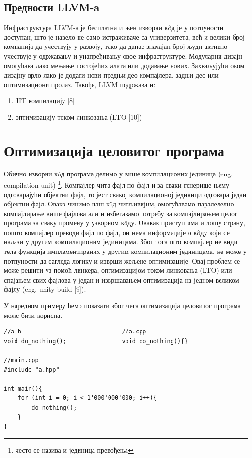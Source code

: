 \documentclass[12pt,oneside]{memoir}
\begin{document}
\section{Предности LLVM-a}

Инфраструктура LLVM-а је бесплатна и њен изворни к\^{o}д је у потпуности доступан, 
што је навело не само истраживаче са универзитета, већ и велики број компанија 
да учествују у развоју, тако да данас значајан број људи активно 
учествује у одржавању и унапређивању овое инфраструктуре.
Модуларни дизајн омогућава лако мењање постојећих алата или додавање нових.
Захваљујући овом дизајну врло лако је додати нови предњи део компајлера, задњи део или
оптимизациони пролаз.
Такође, LLVM подржава и:
\begin{enumerate}
\item JIT компилацију [8]
\item оптимизацију током линковања (LTO [10])
\end{enumerate}

\chapter{Оптимизација целовитог програма}

Обично изворни к\^{o}д програма делимо у више компилационих јединица (eng. compilation unit) \footnote{често се назива и јединица превођења}.
Компајлер чита фајл по фајл и за сваки генерише њему одговарајући објектни фајл,
то јест свакој компилационој јединици одговара један објектни фајл.
Овако чинимо наш к\^{o}д читљивијим, омогућавамо паралелелно компајлирање више 
фајлова али и избегавамо потребу за компајлирањем целог програма за сваку промену
у узворном к\^{o}ду.
Овакав приступ има и лошу страну, пошто компајлер преводи фајл по фајл, он нема 
информације о к\^{o}ду који се налази у другим компилационим јединицама.
Због тога што компајлер не види тела функција имплементираних у другим компилационим
јединицама, не може у потпуности да сагледа логику и изврши жељене оптимизације.
Овај проблем се може решити уз помоћ линкера,
оптимизацијом током линковања (LTO) или спајањем свих фајлова у један и извршавањем
оптимизација на једном великом фајлу (eng. unity build [9]).

У наредном примеру ћемо показати због чега оптимизација целовитог програма 
може бити корисна.

\begin{lstlisting}[frame=single,caption={Primer pozivanja funkcije bez tela}, captionpos=b]
//a.h                             //a.cpp
void do_nothing();                void do_nothing(){} 

//main.cpp          
#include "a.hpp"

int main(){
    for (int i = 0; i < 1'000'000'000; i++){
        do_nothing();
    }
}
\end{lstlisting}
\end{document}
